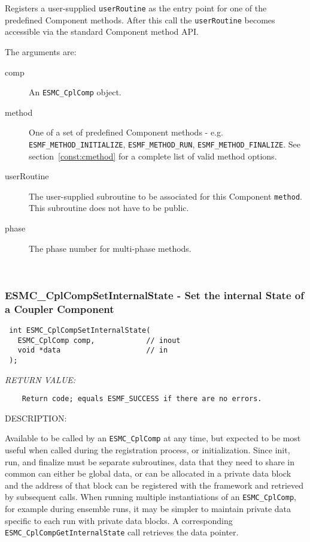   
    Registers a user-supplied {\tt userRoutine} as the entry point for one of 
    the predefined Component methods. After this call the {\tt userRoutine} 
    becomes accessible via the standard Component method API.
  
    The arguments are:
    \begin{description}
    \item[comp]
      An {\tt ESMC\_CplComp} object. 
    \item[method]
      One of a set of predefined Component methods 
      - e.g. {\tt ESMF\_METHOD\_INITIALIZE}, {\tt ESMF\_METHOD\_RUN},
      {\tt ESMF\_METHOD\_FINALIZE}. See section~\ref{const:cmethod}
      for a complete list of valid method options. 
    \item[userRoutine]
      The user-supplied subroutine to be associated for this Component 
      {\tt method}. This subroutine does not have to be public. 
    \item[phase]
      The phase number for multi-phase methods.
    \end{description}
   
 
\mbox{}\hrulefill\ 
 
\subsubsection [ESMC\_CplCompSetInternalState] {ESMC\_CplCompSetInternalState - Set the internal State of a Coupler Component}


  
\begin{verbatim} int ESMC_CplCompSetInternalState(
   ESMC_CplComp comp,            // inout
   void *data                    // in
 );\end{verbatim}{\em RETURN VALUE:}
\begin{verbatim}    Return code; equals ESMF_SUCCESS if there are no errors.\end{verbatim}
{\sf DESCRIPTION:\\ }


  
    Available to be called by an {\tt ESMC\_CplComp} at any time, but
    expected to be most useful when called during the registration process, 
    or initialization. Since init, run, and finalize must be separate
    subroutines, data that they need to share in common can either be global
    data, or can be allocated in a private data block and the address of that 
    block can be registered with the framework and retrieved by subsequent
    calls.
    When running multiple instantiations of an {\tt ESMC\_CplComp}, 
    for example during ensemble runs, it may be simpler to maintain private 
    data specific to each run with private data blocks.  A corresponding 
    {\tt ESMC\_CplCompGetInternalState} call retrieves the data pointer.
     
